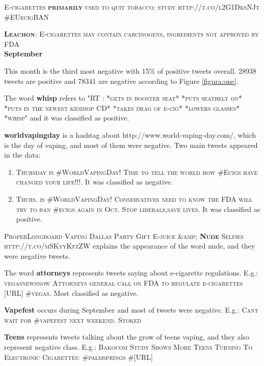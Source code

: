 \documentclass{sig-alternate}
\begin{document}
\textsc{E-cigarettes \textbf{primarily} used to quit tobacco: study http://t.co/l2G1DksNJt \#EUecigBAN}

\textsc{\textbf{Leachon}: E-cigarettes may contain carcinogens, ingredients not approved by FDA}\\


\textbf{September}

This month is the third most negative with 15\%  of positive tweets overall. 28938 tweets are positive and 78341 are negative according to Figure \ref{figura:one}.

The word \textbf{whisp} refers to \textsc{"RT \@YABOYLILB: *gets in booster seat*  *puts seatbelt on*  *puts in the newest kidzbop CD*  *takes drag of e-cig*  *lowers glasses*  *whisp"} and it was classified as positive.

\textbf{worldvapingday} is a hashtag about http://www.world-vaping-day.com/, which is the day of vaping, and most of them were negative. Two main tweets appeared in the data: 
\begin{enumerate}

\item \textsc{Thursday is \#WorldVapingDay!  Time to tell the world how \#Ecigs have changed your life!!!}. It was classified as negative.
\item \textsc{Thurs. is \#WorldVapingDay! Conservatives need to know the FDA will try to ban \#ecigs again in Oct. Stop liberals,save lives}. It was classified as positive.
\end{enumerate}

\textsc{ProperLongboard Vaping Dallas Party Gift E-juice \&amp; \textbf{Nude} Selfies http://t.co/mSKyyKfzZW} explains the appearance of the word nude, and they were negative tweets.

The word \textbf{attorneys} represents tweets saying about e-cigarette regulations. E.g.: \textsc{vegasnewsnow Attorneys general call on FDA to regulate e-cigarettes [URL] \#vegas}. Most classified as negative.

\textbf{Vapefest} occurs during September and most of tweets were negative. E.g.: \textsc{Cant wait for \#vapefest next weekend. Stoked}

\textbf{Teens} represents tweets talking about the grow of teens vaping, and they also represent negative class. E.g.: \textsc{Bakocom Study Shows More Teens Turning To Electronic Cigarettes: \#palmsprings \#[URL]}\\

\end{document}
